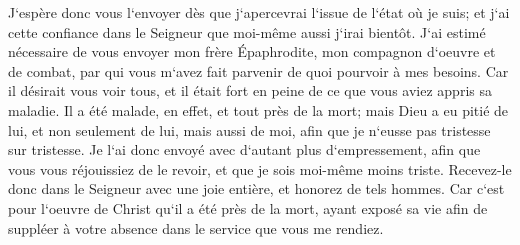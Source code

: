 \verse J`espère donc vous l`envoyer dès que j`apercevrai l`issue de l`état où je suis; 
\verse et j`ai cette confiance dans le Seigneur que moi-même aussi j`irai bientôt. 
\verse J`ai estimé nécessaire de vous envoyer mon frère Épaphrodite, mon compagnon d`oeuvre et de combat, par qui vous m`avez fait parvenir de quoi pourvoir à mes besoins. 
\verse Car il désirait vous voir tous, et il était fort en peine de ce que vous aviez appris sa maladie. 
\verse Il a été malade, en effet, et tout près de la mort; mais Dieu a eu pitié de lui, et non seulement de lui, mais aussi de moi, afin que je n`eusse pas tristesse sur tristesse. 
\verse Je l`ai donc envoyé avec d`autant plus d`empressement, afin que vous vous réjouissiez de le revoir, et que je sois moi-même moins triste. 
\verse Recevez-le donc dans le Seigneur avec une joie entière, et honorez de tels hommes. 
\verse Car c`est pour l`oeuvre de Christ qu`il a été près de la mort, ayant exposé sa vie afin de suppléer à votre absence dans le service que vous me rendiez. 

\chapter{}

